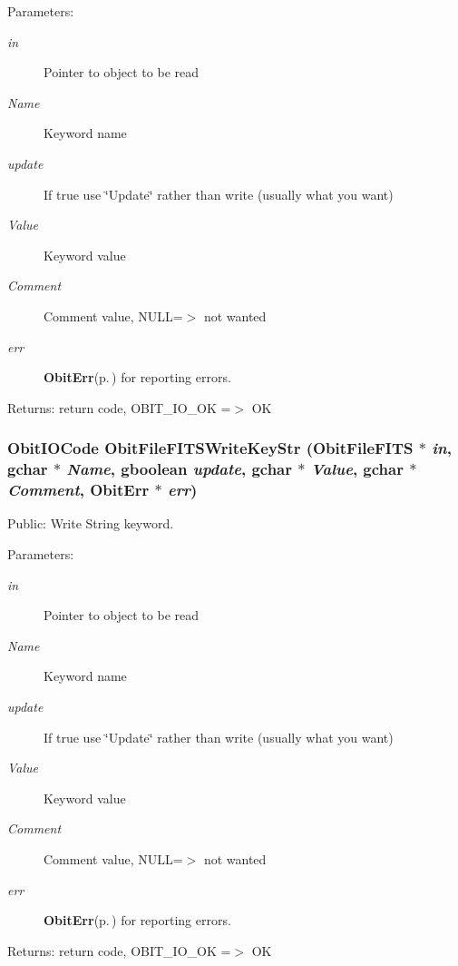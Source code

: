 \begin{Desc}
\item[Parameters:]
\begin{description}
\item[{\em in}]Pointer to object to be read \item[{\em Name}]Keyword name \item[{\em update}]If true use \char`\"{}Update\char`\"{} rather than write (usually what you want) \item[{\em Value}]Keyword value \item[{\em Comment}]Comment value, NULL=$>$ not wanted \item[{\em err}]{\bf Obit\-Err}{\rm (p.\,\pageref{structObitErr})} for reporting errors. \end{description}
\end{Desc}
\begin{Desc}
\item[Returns:]return code, OBIT\_\-IO\_\-OK =$>$ OK \end{Desc}
\subsubsection{\setlength{\rightskip}{0pt plus 5cm}Obit\-IOCode Obit\-File\-FITSWrite\-Key\-Str ({\bf Obit\-File\-FITS} $\ast$ {\em in}, gchar $\ast$ {\em Name}, gboolean {\em update}, gchar $\ast$ {\em Value}, gchar $\ast$ {\em Comment}, {\bf Obit\-Err} $\ast$ {\em err})}\label{ObitFileFITS_8c_a22}


Public: Write String keyword. 

\begin{Desc}
\item[Parameters:]
\begin{description}
\item[{\em in}]Pointer to object to be read \item[{\em Name}]Keyword name \item[{\em update}]If true use \char`\"{}Update\char`\"{} rather than write (usually what you want) \item[{\em Value}]Keyword value \item[{\em Comment}]Comment value, NULL=$>$ not wanted \item[{\em err}]{\bf Obit\-Err}{\rm (p.\,\pageref{structObitErr})} for reporting errors. \end{description}
\end{Desc}
\begin{Desc}
\item[Returns:]return code, OBIT\_\-IO\_\-OK =$>$ OK \end{Desc}
